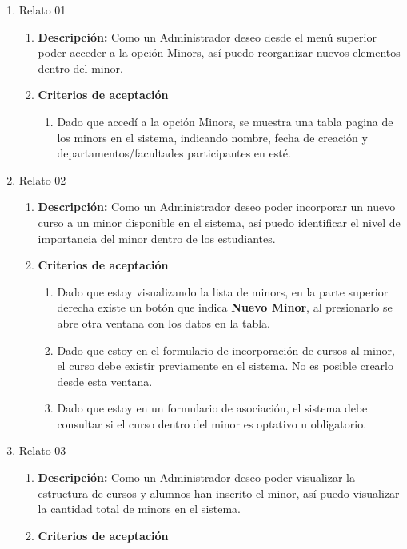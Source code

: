 \begin{enumerate}
	\item Relato 01
		\begin{enumerate}
			\item \textbf{Descripción:} Como un Administrador deseo desde el menú superior poder acceder a la opción Minors, así puedo reorganizar nuevos elementos dentro del minor.
			\item \textbf{Criterios de aceptación}
				\begin{enumerate}
					\item Dado que accedí a la opción Minors, se muestra una tabla pagina de los minors en el sistema, indicando nombre, fecha de creación y departamentos/facultades participantes en esté.
				\end{enumerate}
		\end{enumerate}
	\item Relato 02
		\begin{enumerate}
			\item \textbf{Descripción:} Como un Administrador deseo poder incorporar un nuevo curso a un minor disponible en el sistema, así puedo identificar el nivel de importancia del minor dentro de los estudiantes.
			\item \textbf{Criterios de aceptación}
				\begin{enumerate}
					\item Dado que estoy visualizando la lista de minors, en la parte superior derecha existe un botón que indica \textbf{Nuevo Minor}, al presionarlo se abre otra ventana con los datos en la tabla.
					\item Dado que estoy en el formulario de incorporación de cursos al minor, el curso debe existir previamente en el sistema. No es posible crearlo desde esta ventana.
					\item Dado que estoy en un formulario de asociación, el sistema debe consultar si el curso dentro del minor es optativo u obligatorio.
				\end{enumerate}
		\end{enumerate}
	\item Relato 03
		\begin{enumerate}
			\item \textbf{Descripción:} Como un Administrador deseo poder visualizar la estructura de cursos y alumnos han inscrito el minor, así puedo visualizar la cantidad total de minors en el sistema.
			\item \textbf{Criterios de aceptación}
				\begin{enumerate}

\end{enumerate}
\end{enumerate}
\end{enumerate}
